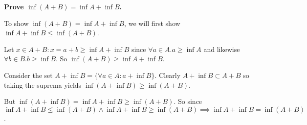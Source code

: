 \documentclass[10pt,a4paper]{article}
\begin{document}
\begin{enumerate}
        \textbf{Prove $\inf(A+B) = \inf A + \inf B $.}

        To show $\inf(A+B) = \inf A + \inf B $, we will first show $\inf A + \inf B \leq \inf(A+B)$.

        Let $x \in A+B : x =a+b  \geq \inf A  + \inf B$ since $\forall a \in A. a \geq \inf A$ and likewise $\forall b \in B. b \geq \inf B$.  So $\inf (A+B) \geq \inf A +  \inf B$.

        Consider the set $A+\inf B = \{\forall a \in A: a+\inf B\}$. Clearly $A + \inf B \subset A+B $ so taking the suprema yields $\inf(A+\inf B)\geq \inf(A+B)$. 

        But $\inf(A + \inf B) = \inf A + \inf B \geq \inf(A+B)$. So since 
        $$\inf A + \inf B \leq \inf(A+B) \land \inf A + \inf B \geq \inf(A+B) \implies \inf A + \inf B = \inf(A+B)$$.





\end{enumerate}
\end{document}
